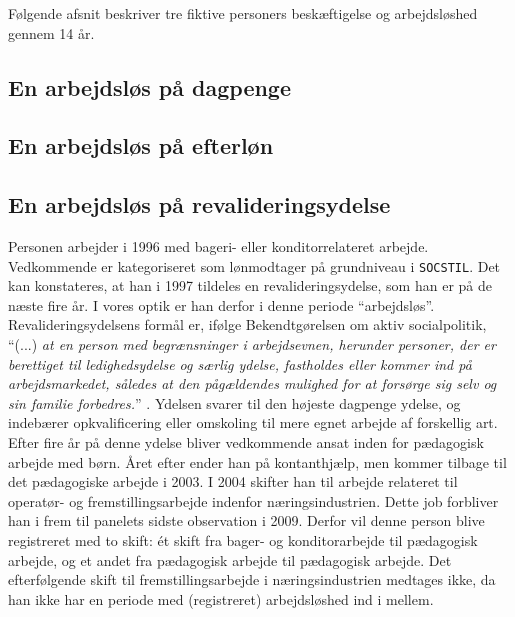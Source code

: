 Følgende afsnit beskriver tre fiktive personers beskæftigelse og arbejdsløshed gennem 14 år.

\subsection{En arbejdsløs på dagpenge \label{}} 

\subsection{En arbejdsløs på efterløn \label{}} 

\subsection{En arbejdsløs på revalideringsydelse \label{}} 
Personen arbejder i 1996 med bageri- eller konditorrelateret arbejde. Vedkommende er kategoriseret som lønmodtager på grundniveau i \texttt{SOCSTIL}. Det kan konstateres, at han i 1997 tildeles en revalideringsydelse, som han er på de næste fire år. I vores optik er han derfor i denne periode “arbejdsløs”. Revalideringsydelsens formål er, ifølge Bekendtgørelsen om aktiv socialpolitik, “(...) \emph{at en person med begrænsninger i arbejdsevnen, herunder personer, der er berettiget til ledighedsydelse og særlig ydelse, fastholdes eller kommer ind på arbejdsmarkedet, således at den pågældendes mulighed for at forsørge sig selv og sin familie forbedres.}” \parencite{lov_revalidering}. Ydelsen svarer til den højeste dagpenge ydelse, og indebærer opkvalificering eller omskoling til mere egnet arbejde af forskellig art.  Efter fire år på denne ydelse bliver vedkommende ansat inden for pædagogisk arbejde med børn. Året efter ender han på kontanthjælp, men kommer tilbage til det pædagogiske arbejde i 2003. I 2004 skifter han til arbejde relateret til operatør- og fremstillingsarbejde indenfor næringsindustrien. Dette job forbliver han i frem til panelets sidste observation i 2009. Derfor vil denne person blive registreret med to skift: ét skift fra bager- og konditorarbejde til pædagogisk arbejde, og et andet fra pædagogisk arbejde til pædagogisk arbejde. Det efterfølgende skift til fremstillingsarbejde i næringsindustrien medtages ikke, da han ikke har en periode med (registreret) arbejdsløshed ind i mellem.


